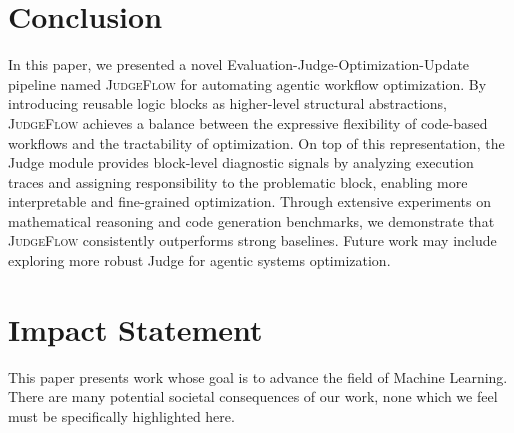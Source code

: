 \documentclass{article}
\theoremstyle{plain}
\theoremstyle{definition}
\theoremstyle{remark}
\def \our{\textsc{JudgeFlow}}
\begin{document}
\section{Conclusion}
In this paper, we presented a novel Evaluation-Judge-Optimization-Update pipeline named \our{} for automating agentic workflow optimization. By introducing reusable logic blocks as higher-level structural abstractions, \our{} achieves a balance between the expressive flexibility of code-based workflows and the tractability of optimization. On top of this representation, the Judge module provides block-level diagnostic signals by analyzing execution traces and assigning responsibility to the problematic block, enabling more interpretable and fine-grained optimization. Through extensive experiments on mathematical reasoning and code generation benchmarks, we demonstrate that \our{} consistently outperforms strong baselines.
Future work may include exploring more robust Judge for agentic systems optimization.
































\section*{Impact Statement}

This paper presents work whose goal is to advance the field of Machine
Learning. There are many potential societal consequences of our work, none
which we feel must be specifically highlighted here.












\newpage
\appendix
\onecolumn
\end{document}
